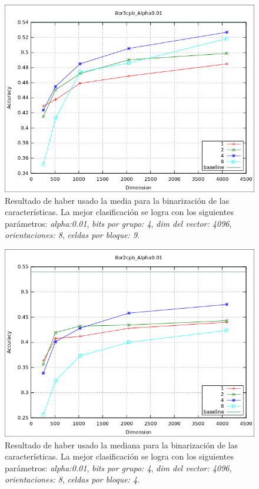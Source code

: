 			\begin{figure}[htbp!]
				\centering
				\includegraphics[scale=0.6]{img/resultados/reales/media_8or3cpb_Alpha0,01.png}
				\caption[Reales con umbral media]{Resultado de haber usado la media para la binarización de las características. La mejor clasificación se logra con los siguientes parámetros: \textit{alpha:0.01}, \textit{bits por grupo: 4}, \textit{dim del vector: 4096}, \textit{orientaciones: 8}, \textit{celdas por bloque: 9}.}
				\label{fig: Reales-media-8or9cpbAlph0.01}
			\end{figure}
			
			\begin{figure}[htbp]
				\centering
				\includegraphics[scale=0.6]{img/resultados/reales/median_8or2cpb_Alpha0,01.png}
				\caption[Reales con umbral mediana]{Resultado de haber usado la mediana para la binarización de las características. La mejor clasificación se logra con los siguientes parámetros: \textit{alpha:0.01}, \textit{bits por grupo: 4}, \textit{dim del vector: 4096}, \textit{orientaciones: 8}, \textit{celdas por bloque: 4}.}
				\label{fig: Reales-mediana-8or4cpbAlph0.01}
			\end{figure}
			
